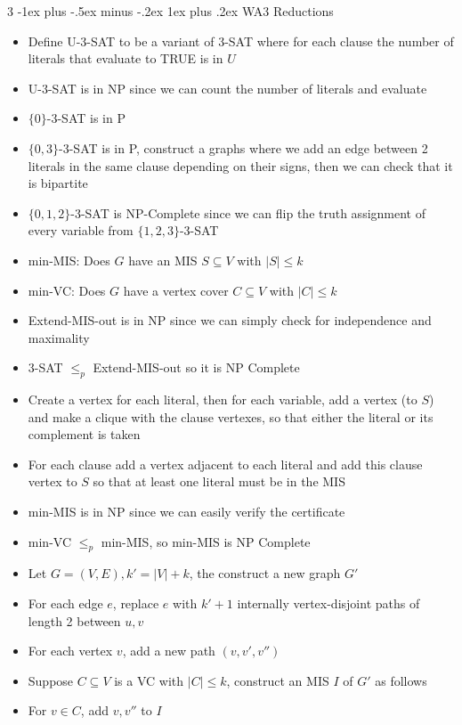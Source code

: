 \documentclass[10pt, landscape]{article}
\makeatletter
\renewcommand{\subsection}{\@startsection{subsection}{3}{0mm}%
                                {-1ex plus -.5ex minus -.2ex}%
                                {1ex plus .2ex}%
                                {\normalfont\small\bfseries}}%
\makeatother
\begin{document}
\begin{multicols*}{3}
\subsection{WA3 Reductions}
\begin{itemize}
    \item Define U-3-SAT to be a variant of 3-SAT where for each clause the number of literals that evaluate to TRUE is in $U$
    \item U-3-SAT is in NP since we can count the number of literals and evaluate
    \item $\{0\}$-3-SAT is in P
    \item $\{0,3\}$-3-SAT is in P, construct a graphs where we add an edge between 2 literals in the same clause depending on their signs, then we can check that it is bipartite
    \item $\{0,1,2\}$-3-SAT is NP-Complete since we can flip the truth assignment of every variable from $\{1,2,3\}$-3-SAT
    \item min-MIS: Does $G$ have an MIS $S \subseteq V$ with $|S| \leq k$
    \item min-VC: Does $G$ have a vertex cover $C \subseteq V$ with $|C| \leq k$
    \item Extend-MIS-out is in NP since we can simply check for independence and maximality
    \item 3-SAT $\leq_p$ Extend-MIS-out so it is NP Complete
    \item Create a vertex for each literal, then for each variable, add a vertex (to $S$) and make a clique with the clause vertexes, so that either the literal or its complement is taken
    \item For each clause add a vertex adjacent to each literal and add this clause vertex to $S$ so that at least one literal must be in the MIS
    \item min-MIS is in NP since we can easily verify the certificate
    \item min-VC $\leq_p$ min-MIS, so min-MIS is NP Complete
    \item Let $G=(V,E), k'=|V|+k$, the construct a new graph $G'$
    \item For each edge $e$, replace $e$ with $k'+1$ internally vertex-disjoint paths of length 2 between $u,v$
    \item For each vertex $v$, add a new path $(v,v',v'')$
    \item Suppose $C \subseteq V$ is a VC with $|C| \leq k$, construct an MIS $I$ of $G'$ as follows
    \item For $v \in C$, add $v,v''$ to $I$

\end{itemize}
\end{multicols*}
\end{document}
